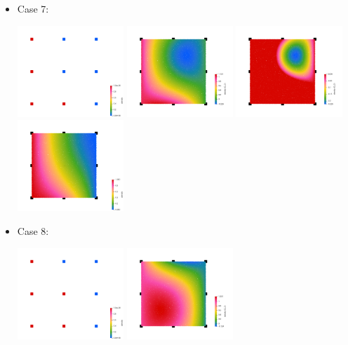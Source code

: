 \begin{itemize}
\begin{center}
\end{center}
\item Case 7:
\begin{center}
\includegraphics[width=4cm]{images/bernstein/nodes0006.png}
\includegraphics[width=4cm]{images/bernstein/rhoQ2_6.png}
\includegraphics[width=4cm]{images/bernstein/rhoQ2neg_6.png}
\includegraphics[width=4cm]{images/bernstein/rhoB2_6.png}\\
\end{center}
\item Case 8:
\begin{center}
\includegraphics[width=4cm]{images/bernstein/nodes0007.png}
\includegraphics[width=4cm]{images/bernstein/rhoQ2_7.png}

\end{center}
\end{itemize}
